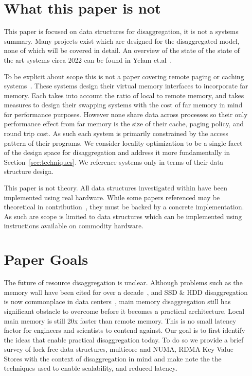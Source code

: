\section{What this paper is not}
\label{sec:not}

This paper is focused on data structures for disaggregation, it is not a systems
summary.  Many projects exist which are designed for the disaggregated model,
none of which will be covered in detail. An overview of the state of the state
of the art systems circa 2022 can be found in Yelam
et.al~\cite{yelam2022systems}.

To be explicit about scope this is not a paper covering remote paging or caching
systems~\cite{fastswap,kona,infiniswap,leap,legoos}. These systems design their
virtual memory interfaces to incorporate far memory. Each takes into account the
ratio of local to remote memory, and takes measures to design their swapping
systems with the cost of far memory in mind for performance purposes.  However
none share data across processes so their only performance effect from far
memory is the size of their cache, paging policy, and round trip cost. As such
each system is primarily constrained by the access pattern of their programs. We
consider locality optimization to be a single facet of the design space for
disaggregation and address it more fundamentally in
Section~\ref{sec:techniques}. We reference systems only in terms of their data
structure design.

This paper is not theory. All data structures investigated within have been
implemented using real hardware. While some papers referenced may be theoretical
in contribution~\cite{flat-combine,hopscotch,linked-list-cas}, they must be
backed by a concrete implementation. As such are scope is limited to data
structures which can be implemented using instructions available on commodity
hardware.

\section{Paper Goals}

The future of resource disaggregation is unclear. Although problems such as the
memory wall have been cited for over a decade~\cite{blade-server}, and SSD \&
HDD disaggregation is now commonplace in data centers~\cite{decible}, main
memory disaggregation still has significant obstacle to overcome before it
becomes a practical architecture.  Local main memory is still 20x faster than
remote memory. This is no small latency factor for engineers and scientists to
contend against. Our goal is to first identify the ideas that enable practical
disaggregation today. To do so we provide a brief survey of lock free data
structures, multicore and NUMA, RDMA Key Value Stores with the context of
disaggregation in mind and make note the the techniques used to enable
scalability, and reduced latency.

